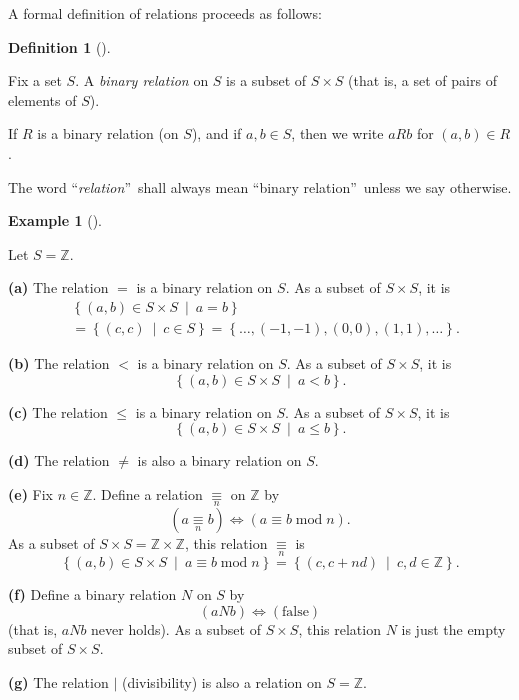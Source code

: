 \documentclass[numbers=enddot,12pt,final,onecolumn,notitlepage]{scrartcl}%
\numberwithin{exer}{subsection}
\theoremstyle{definition}
\newtheorem{defi}[theo]{Definition}
\newenvironment{definition}[1][]
{\begin{defi}[#1]\begin{leftbar}}
{\end{leftbar}\end{defi}}
\newtheorem{exam}[theo]{Example}
\newenvironment{example}[1][]
{\begin{exam}[#1]\begin{leftbar}}
{\end{leftbar}\end{exam}}
\begin{document}
A formal definition of relations proceeds as follows:

\begin{definition}
Fix a set $S$. A \textit{binary relation} on $S$ is a subset of $S\times S$
(that is, a set of pairs of elements of $S$).

If $R$ is a binary relation (on $S$), and if $a,b\in S$, then we write $aRb$
for $\left(  a,b\right)  \in R$.

The word \textquotedblleft\textit{relation}\textquotedblright\ shall always
mean \textquotedblleft binary relation\textquotedblright\ unless we say otherwise.
\end{definition}

\begin{example}
Let $S=\mathbb{Z}$.

\textbf{(a)} The relation $=$ is a binary relation on $S$. As a subset of
$S\times S$, it is%
\begin{align*}
&  \left\{  \left(  a,b\right)  \in S\times S\ \mid\ a=b\right\} \\
&  =\left\{  \left(  c,c\right)  \ \mid\ c\in S\right\}  =\left\{
\ldots,\left(  -1,-1\right)  ,\left(  0,0\right)  ,\left(  1,1\right)
,\ldots\right\}  .
\end{align*}


\textbf{(b)} The relation $<$ is a binary relation on $S$. As a subset of
$S\times S$, it is%
\[
\left\{  \left(  a,b\right)  \in S\times S\ \mid\ a<b\right\}  .
\]


\textbf{(c)} The relation $\leq$ is a binary relation on $S$. As a subset of
$S\times S$, it is%
\[
\left\{  \left(  a,b\right)  \in S\times S\ \mid\ a\leq b\right\}  .
\]


\textbf{(d)} The relation $\neq$ is also a binary relation on $S$.

\textbf{(e)} Fix $n\in\mathbb{Z}$. Define a relation $\underset{n}{\equiv}$ on
$\mathbb{Z}$ by
\[
\left(  a\underset{n}{\equiv}b\right)  \Longleftrightarrow\left(  a\equiv
b\operatorname{mod}n\right)  .
\]
As a subset of $S\times S=\mathbb{Z}\times\mathbb{Z}$, this relation
$\underset{n}{\equiv}$ is%
\[
\left\{  \left(  a,b\right)  \in S\times S\ \mid\ a\equiv b\operatorname{mod}%
n\right\}  =\left\{  \left(  c,c+nd\right)  \ \mid\ c,d\in\mathbb{Z}\right\}
.
\]


\textbf{(f)} Define a binary relation $N$ on $S$ by%
\[
\left(  aNb\right)  \Longleftrightarrow\left(  \text{false}\right)
\]
(that is, $aNb$ never holds). As a subset of $S\times S$, this relation $N$ is
just the empty subset of $S\times S$.

\textbf{(g)} The relation $\mid$ (divisibility) is also a relation on
$S=\mathbb{Z}$.
\end{example}
\end{document}
